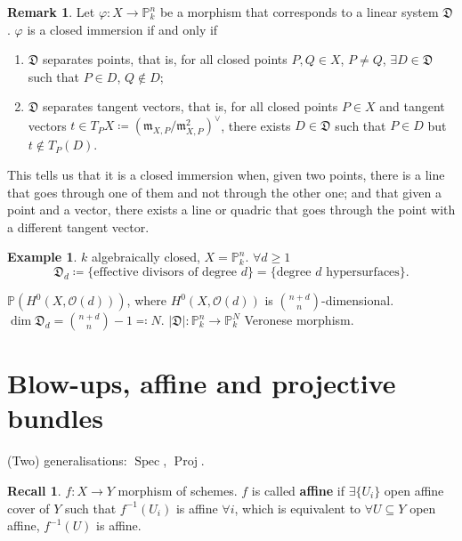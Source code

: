 \documentclass[12pt]{article}
\DeclareMathOperator{\Spec}{Spec}
\DeclareMathOperator{\Proj}{Proj}
\theoremstyle{definition}
\newtheorem*{remark}{Remark}
\newtheorem*{recall}{Recall}
\newtheorem*{example}{Example}
\begin{document}
\begin{remark}
Let $\varphi:X\rightarrow\mathbb P_k^n$ be a morphism that corresponds to a linear system $\mathfrak D$. $\varphi$ is a closed immersion if and only if
\begin{enumerate}[label=\arabic*)]
\item $\mathfrak D$ separates points, that is, for all closed points $P,Q\in X$, $P\neq Q$, $\exists D\in\mathfrak D$ such that $P\in D$, $Q\notin D$;
\item $\mathfrak D$ separates tangent vectors, that is, for all closed points $P\in X$ and tangent vectors $t\in T_PX\coloneqq(\mathfrak m_{X,P}/\mathfrak m_{X,P}^2)^\vee$, there exists $D\in\mathfrak D$ such that $P\in D$ but $t\notin T_P(D)$.
\end{enumerate}
\end{remark}

This tells us that it is a closed immersion when, given two points, there is a line that goes through one of them and not through the other one; and that given a point and a vector, there exists a line or quadric that goes through the point with a different tangent vector.

\begin{example}
$k$ algebraically closed, $X=\mathbb P_k^n$. $\forall d\geq1$
\[\mathfrak D_d\coloneqq\{\text{effective divisors of degree }d\}=\{\text{degree }d\text{ hypersurfaces}\}.\]

$\mathbb P(H^0(X,\mathcal O(d)))$, where $H^0(X,\mathcal O(d))$ is $\binom{n+d}n$-dimensional. $\dim\mathfrak D_d=\binom{n+d}n-1\eqqcolon N$. $|\mathfrak D|:\mathbb P_k^n\rightarrow\mathbb P_k^N$ Veronese morphism.
\end{example}

\section{Blow-ups, affine and projective bundles}
(Two) generalisations: $\Spec$, $\Proj$.

\begin{recall}
$f:X\rightarrow Y$ morphism of schemes. $f$ is called \textbf{affine} if $\exists\{U_i\}$ open affine cover of $Y$ such that $f^{-1}(U_i)$ is affine $\forall i$, which is equivalent to $\forall U\subseteq Y$ open affine, $f^{-1}(U)$ is affine.
\end{recall}
\end{document}

